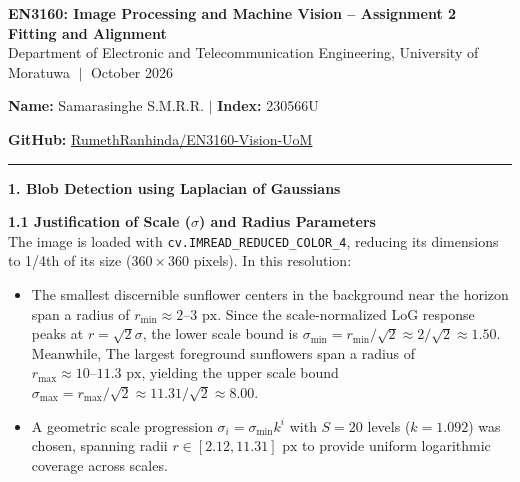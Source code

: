 \documentclass[10pt]{article}
\begin{document}
	
	\begin{center}
		{\Large \textbf{EN3160: Image Processing and Machine Vision -- Assignment 2}} \\
		\vspace{0.06cm}
		{\large \textbf{\color{uomaccent} Fitting and Alignment}} \\
		\vspace{0.06cm}
		\footnotesize Department of Electronic and Telecommunication Engineering, University of Moratuwa $\;\vert\;$ October 2026
	\end{center}
	
	\vspace{-0.15cm}
	\noindent\begin{minipage}{0.48\textwidth}
		\footnotesize \textbf{Name:} Samarasinghe S.M.R.R. \quad $\vert$ \quad \textbf{Index:} 230566U
	\end{minipage}
	\hfill
	\begin{minipage}{0.48\textwidth}
		\raggedleft\footnotesize
		\textbf{GitHub:} \href{https://github.com/RumethRanhinda/EN3160-Vision-UoM/tree/main/Assignments/Fitting\%20and\%20Alignment}{RumethRanhinda/EN3160-Vision-UoM}
	\end{minipage}
	
	\vspace{0.05cm}
	\noindent\rule{\textwidth}{0.5pt}
	\vspace{0.1cm}
	
	\noindent\textbf{\large \color{uomaccent} 1. Blob Detection using Laplacian of Gaussians}
	\vspace{0.1cm}
	
	\noindent\textbf{1.1 Justification of Scale ($\sigma$) and Radius Parameters} \\
	The image is loaded with \texttt{cv.IMREAD\_REDUCED\_COLOR\_4}, reducing its dimensions to 1/4th of its size ($360 \times 360$ pixels). In this resolution:
	\begin{itemize}[leftmargin=*, nosep]
		\item The smallest discernible sunflower centers in the background near the horizon span a radius of $r_{\min} \approx 2\text{--}3\text{ px}$. Since the scale-normalized LoG response peaks at $r = \sqrt{2}\sigma$, the lower scale bound is $\sigma_{\min} = r_{\min} / \sqrt{2} \approx 2 / \sqrt{2} \approx 1.50$. Meanwhile, The largest foreground sunflowers span a radius of $r_{\max} \approx 10\text{--}11.3\text{ px}$, yielding the upper scale bound $\sigma_{\max} = r_{\max} / \sqrt{2} \approx 11.31 / \sqrt{2} \approx 8.00$.
		\item A geometric scale progression $\sigma_i = \sigma_{\min} k^i$ with $S = 20$ levels ($k = 1.092$) was chosen, spanning radii $r \in [2.12, 11.31]\text{ px}$ to provide uniform logarithmic coverage across scales.
	\end{itemize}
\end{document}
